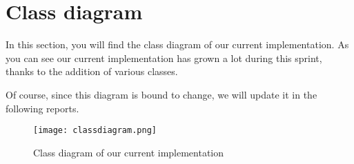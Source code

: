 \section{Class diagram}

In this section, you will find the class diagram of our current implementation. As you can see 
our current implementation has grown a lot during this sprint, thanks to the addition of various classes. \newline

Of course, since this diagram is bound to change, we will update it in the following reports.

\begin{figure}[!ht]
	\centering
	\texttt{[image: classdiagram.png]}
	\caption{Class diagram of our current implementation}
	\label{fig:length_eight_mouse}
\end{figure}
\FloatBarrier
